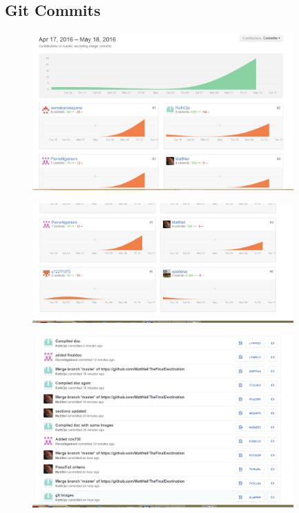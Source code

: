 \subsection{Git Commits}

\begin{figure}[H]
  		\centering
      	\includegraphics[width=100mm]{graphOne}	      	
  		\caption{}
\end{figure}

\begin{figure}[H]
  		\centering
      	\includegraphics[width=100mm]{graphTwo}	      	
  		\caption{}
\end{figure}

\begin{figure}[H]
  		\centering
      	\includegraphics[width=100mm]{gitFour}	      	
  		\caption{}
\end{figure}

